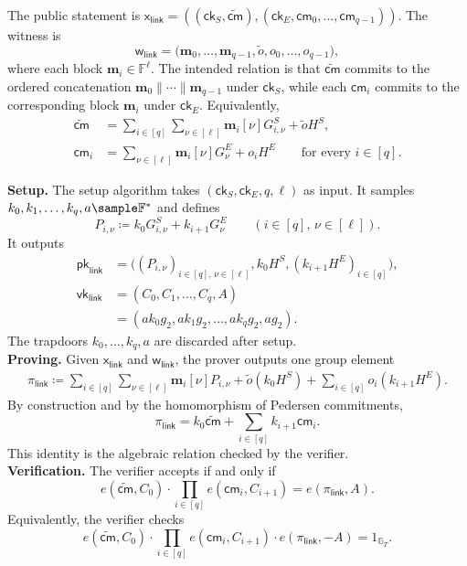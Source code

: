 \documentclass[conference,compsoc]{IEEEtran}
\newcommand{\cm}{\textsf{cm}}
\newcommand{\ck}{\textsf{ck}}
\newcommand{\vect}{\mathbf}         %
\renewcommand{\pk}{{\textsf{pk}}}
\renewcommand{\vk}{{\textsf{vk}}}
\renewcommand{\ck}{{\textsf{ck}}}
\newcommand{\stmt}{\mathsf{x}}      %
\newcommand{\wit}{\mathsf{w}}       %
\theoremstyle{plain}
\theoremstyle{definition}
\theoremstyle{remark}
\begin{document}
The public statement is
\(\stmt_{\mathsf{link}}=((\ck_S,\widetilde{\cm}),
(\ck_E,\cm_0,\ldots,\cm_{q-1}))\).  The witness is
\[
  \wit_{\mathsf{link}}
  =
  \big(
    \vect{m}_0,\ldots,\vect{m}_{q-1},
    \widetilde{o},
    o_0,\ldots,o_{q-1}
  \big),
\]
where each block \(\vect{m}_i\in\mathbb{F}^{\ell}\).  The intended relation is
that \(\widetilde{\cm}\) commits to the ordered concatenation
\(\vect{m}_0\|\cdots\|\vect{m}_{q-1}\) under \(\ck_S\), while each
\(\cm_i\) commits to the corresponding block \(\vect{m}_i\) under \(\ck_E\).
Equivalently,
\[
\begin{aligned}
  \widetilde{\cm}
  &=
  \sum_{i\in[q]}\sum_{\nu\in[\ell]}
  \vect{m}_i[\nu]G^S_{i,\nu}
  +
  \widetilde{o}H^S, \\
  \cm_i
  &=
  \sum_{\nu\in[\ell]}
  \vect{m}_i[\nu]G^E_{\nu}
  +
  o_iH^E
  \qquad \text{for every } i\in[q].
\end{aligned}
\]

\noindent\textbf{Setup.}
The setup algorithm takes \((\ck_S,\ck_E,q,\ell)\) as input.  It samples
\(k_0,k_1,\ldots,k_q,a\sample\mathbb{F}^{\ast}\) and defines
\[
  P_{i,\nu} \coloneqq k_0G^S_{i,\nu}+k_{i+1}G^E_{\nu}
  \qquad
  (i\in[q],\,\nu\in[\ell]).
\]
It outputs
\[
\begin{aligned}
  \pk_{\mathsf{link}}
  &=
  \Big(
    (P_{i,\nu})_{i\in[q],\,\nu\in[\ell]},
    k_0H^S,
    (k_{i+1}H^E)_{i\in[q]}
  \Big), \\
  \vk_{\mathsf{link}}
  &=
  (C_0,C_1,\ldots,C_q,A)
  \\
  &=
  (ak_0g_2,ak_1g_2,\ldots,ak_qg_2,ag_2).
\end{aligned}
\]
The trapdoors \(k_0,\ldots,k_q,a\) are discarded after setup. \\

\noindent\textbf{Proving.}
Given \(\stmt_{\mathsf{link}}\) and \(\wit_{\mathsf{link}}\), the prover
outputs one group element
\[
\begin{aligned}
  \pi_{\mathsf{link}}
  \coloneqq
  \sum_{i\in[q]}\sum_{\nu\in[\ell]}
  \vect{m}_i[\nu]P_{i,\nu}
  +
  \widetilde{o}(k_0H^S)
  +
  \sum_{i\in[q]} o_i(k_{i+1}H^E).
\end{aligned}
\]
By construction and by the homomorphism of Pedersen commitments,
\[
  \pi_{\mathsf{link}}
  =
  k_0\widetilde{\cm}
  +
  \sum_{i\in[q]} k_{i+1}\cm_i .
\]
This identity is the algebraic relation checked by the verifier. \\

\noindent\textbf{Verification.}
The verifier accepts if and only if
\[
  e(\widetilde{\cm},C_0)
  \cdot
  \prod_{i\in[q]} e(\cm_i,C_{i+1})
  =
  e(\pi_{\mathsf{link}},A).
\]
Equivalently, the verifier checks
\[
  e(\widetilde{\cm},C_0)
  \cdot
  \prod_{i\in[q]} e(\cm_i,C_{i+1})
  \cdot
  e(\pi_{\mathsf{link}},-A)
  =
  1_{\mathbb{G}_T}.
\]
\end{document}
